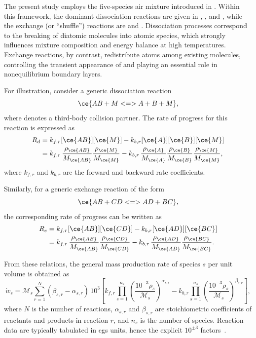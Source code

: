 The present study employs the five-species air mixture introduced in . Within this framework, the dominant dissociation reactions are given in , , and , while the exchange (or ``shuffle'') reactions are  and . Dissociation processes correspond to the breaking of diatomic molecules into atomic species, which strongly influences mixture composition and energy balance at high temperatures. Exchange reactions, by contrast, redistribute atoms among existing molecules, controlling the transient appearance of  and playing an essential role in nonequilibrium boundary layers.

For illustration, consider a generic dissociation reaction
%
\begin{equation}\label{equation:generic_diss}
    \ce{AB + M <=> A + B + M},
\end{equation}
%
where  denotes a third-body collision partner. The rate of progress for this reaction is expressed as
%
\begin{align}
    R_d &= k_{f,r}[\ce{AB}][\ce{M}] - k_{b,r}[\ce{A}][\ce{B}][\ce{M}] \\
        &= k_{f,r} \,\frac{\rho_{\ce{AB}}}{M_{\ce{AB}}}\frac{\rho_{\ce{M}}}{M_{\ce{M}}}
           - k_{b,r}\,\frac{\rho_{\ce{A}}}{M_{\ce{A}}}\frac{\rho_{\ce{B}}}{M_{\ce{B}}}\frac{\rho_{\ce{M}}}{M_{\ce{M}}},
\end{align}
%
where $k_{f,r}$ and $k_{b,r}$ are the forward and backward rate coefficients.  

Similarly, for a generic exchange reaction of the form
%
\begin{equation}
    \ce{AB + CD <=> AD + BC},
\end{equation}
%
the corresponding rate of progress can be written as
%
\begin{align}
    R_e &= k_{f,r}[\ce{AB}][\ce{CD}] - k_{b,r}[\ce{AD}][\ce{BC}] \\
        &= k_{f,r} \,\frac{\rho_{\ce{AB}}}{M_{\ce{AB}}}\frac{\rho_{\ce{CD}}}{M_{\ce{CD}}}
           - k_{b,r}\,\frac{\rho_{\ce{AD}}}{M_{\ce{AD}}}\frac{\rho_{\ce{BC}}}{M_{\ce{BC}}}.
\end{align}

From these relations, the general mass production rate of species $s$ per unit volume is obtained as~\citep{Gnoffo1989}
%
\begin{equation}\label{equation:wdot}
    \dot{w}_s = \mathcal{M}_s \sum_{r=1}^{N} (\beta_{s,r}-\alpha_{s,r}) \,10^3
    \left[
        k_{f,r}\prod_{s=1}^{n_s}\left(\frac{10^{-3}\rho_s}{\mathcal{M}_s}\right)^{\alpha_{s,r}}
        - k_{b,r}\prod_{s=1}^{n_s}\left(\frac{10^{-3}\rho_s}{\mathcal{M}_s}\right)^{\beta_{s,r}}
    \right],
\end{equation}
%
where $N$ is the number of reactions, $\alpha_{s,r}$ and $\beta_{s,r}$ are stoichiometric coefficients of reactants and products in reaction $r$, and $n_s$ is the number of species. Reaction data are typically tabulated in cgs units, hence the explicit $10^{\pm 3}$ factors~\citep{Gnoffo1989,Park1990,park2001}.  


